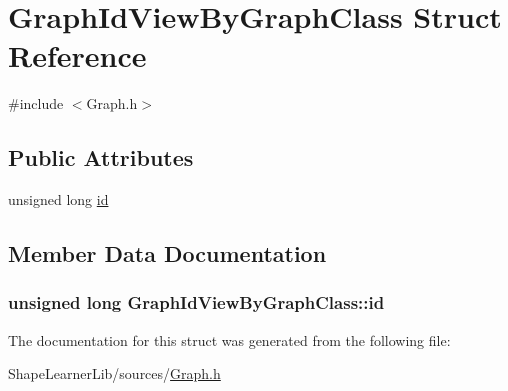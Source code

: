 \hypertarget{struct_graph_id_view_by_graph_class}{}\section{Graph\+Id\+View\+By\+Graph\+Class Struct Reference}
\label{struct_graph_id_view_by_graph_class}


{\ttfamily \#include $<$Graph.\+h$>$}

\subsection*{Public Attributes}
\begin{DoxyCompactItemize}
\item 
unsigned long \hyperlink{struct_graph_id_view_by_graph_class_acf5209797a1eb42ee38c48a4157e8094}{id}
\end{DoxyCompactItemize}


\subsection{Member Data Documentation}
\hypertarget{struct_graph_id_view_by_graph_class_acf5209797a1eb42ee38c48a4157e8094}{}
\subsubsection[{id}]{\setlength{\rightskip}{0pt plus 5cm}unsigned long Graph\+Id\+View\+By\+Graph\+Class\+::id}\label{struct_graph_id_view_by_graph_class_acf5209797a1eb42ee38c48a4157e8094}


The documentation for this struct was generated from the following file\+:\begin{DoxyCompactItemize}
\item 
Shape\+Learner\+Lib/sources/\hyperlink{_graph_8h}{Graph.\+h}\end{DoxyCompactItemize}
